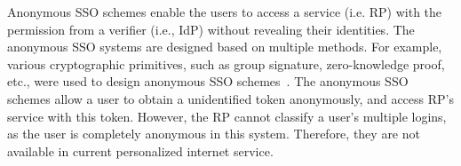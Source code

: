 Anonymous SSO schemes enable the users to access a service (i.e. RP) with the permission from a verifier (i.e., IdP) without revealing their identities.
The anonymous SSO systems are designed based on multiple methods. For example, various cryptographic primitives, such as group signature, zero-knowledge proof, etc., were used to design anonymous SSO schemes~\cite{WangWS13,HanCSTW18}. 
The anonymous SSO schemes allow a user to obtain a unidentified token anonymously, and access RP's service with this token. However, the RP cannot classify a user's multiple logins, as the user is completely anonymous in this system. Therefore, they are not available in current personalized internet service.


